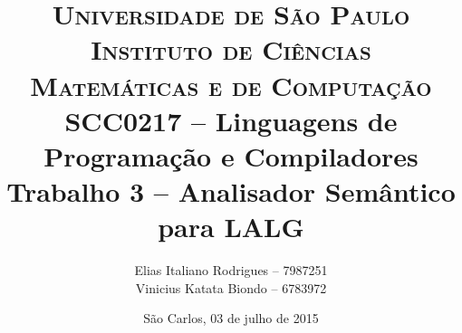 \begin{titlepage}

		\title{
\textsc {\large{Universidade de São Paulo\\
Instituto de Ciências Matemáticas e de Computação}}\\[1cm]
\large{SCC0217 -- Linguagens de Programação e Compiladores}\\[6cm]
\LARGE{Trabalho 3 -- Analisador Semântico para LALG}\\[5.5cm]
		}

		\author{
Elias Italiano Rodrigues -- 7987251\\
Vinicius Katata Biondo -- 6783972
		}

		\date{
\vfill São Carlos, 03 de julho de 2015
		}

		\maketitle
		\thispagestyle{empty}

\end{titlepage}
